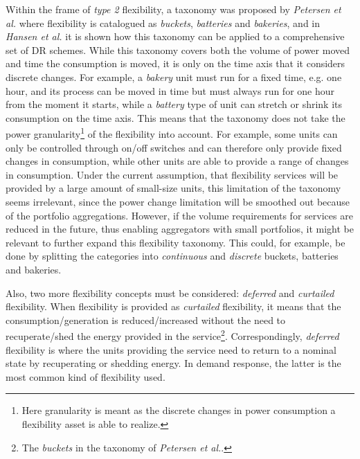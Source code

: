 Within the frame of \emph{type 2} flexibility, a taxonomy was proposed by \emph{Petersen et al.} where flexibility is catalogued as \emph{buckets}, \emph{batteries} and \emph{bakeries}, and in \emph{Hansen et al.} it is shown how this taxonomy can be applied to a comprehensive set of DR schemes. While this taxonomy covers both the volume of power moved and time the consumption is moved, it is only on the time axis that it considers discrete changes. For example, a \emph{bakery} unit must run for a fixed time, e.g. one hour, and its process can be moved in time but must always run for one hour from the moment it starts, while a \emph{battery} type of unit can stretch or shrink its consumption on the time axis. This means that the taxonomy does not take the power granularity\footnote{Here granularity is meant as the discrete changes in power consumption a flexibility asset is able to realize.} of the flexibility into account. For example, some units can only be controlled through on/off switches and can therefore only provide fixed changes in consumption, while other units are able to provide a range of changes in consumption. Under the current assumption, \ie that flexibility services will be provided by a large amount of small-size units, this limitation of the taxonomy seems irrelevant, since the power change limitation will be smoothed out because of the portfolio aggregations. However, if the volume requirements for services are reduced in the future, thus enabling aggregators with small portfolios, it might be relevant to further expand this flexibility taxonomy. This could, for example, be done by splitting the categories into \emph{continuous} and \emph{discrete} buckets, batteries and bakeries.

Also, two more flexibility concepts must be considered: \emph{deferred} and \emph{curtailed} flexibility. When flexibility is provided as \emph{curtailed} flexibility,  it means that the consumption/generation is reduced/increased without the need to recuperate/shed the energy provided in the service\footnote{The \emph{buckets} in the taxonomy of \emph{Petersen et al.}.}. Correspondingly, \emph{deferred} flexibility is where the units providing the service need to return to a nominal state by recuperating or shedding energy. In demand response, the latter is the most common kind of flexibility used.

